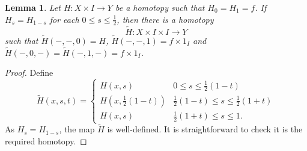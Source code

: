 \documentclass[a4]{amsart}
\newtheorem{lemma}[theorem]{Lemma}
\theoremstyle{definition}
\begin{document}
\begin{sloppypar}
\begin{lemma}\label{H+Hv=1lemma}
Let $H: X\times I\stackrel{}{\longrightarrow} Y$ be a homotopy such that $H_0=H_1=f$. 
If $H_s=H_{1-s}$ for each $0\leq s\leq \frac{1}{2}$, then there is a homotopy
\[
\widetilde{H}: X\times I\times I\stackrel{}{\longrightarrow} Y
\]
such that $\widetilde{H}(-, -, 0)=H$, $\widetilde{H}(-, -, 1)= f\times 1_{I}$ and $\widetilde{H}(-, 0, -)=\widetilde{H}(-, 1, -)=f\times 1_{I}$.
\end{lemma}
\begin{proof}
Define 
\[
\widetilde{H}(x, s, t)=
\left\{\begin{array}{cc}
H(x, s) &  0\leq s\leq \frac{1}{2}(1-t)\\
H(x, \frac{1}{2}(1-t)) &\frac{1}{2}(1-t) \leq  s\leq \frac{1}{2}(1+t)\\
H(x, s) & \frac{1}{2}(1+t)\leq s\leq  1.
\end{array}\right.
\]
As $H_s=H_{1-s}$, the map $\widetilde{H}$ is well-defined. It is straightforward to check it is the required homotopy. 
\end{proof}



\end{sloppypar}
\end{document}

